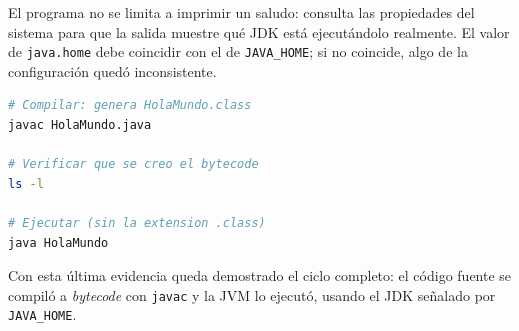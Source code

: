El programa no se limita a imprimir un saludo: consulta las propiedades del sistema para
que la salida muestre qué JDK está ejecutándolo realmente. El valor de
\texttt{java.home} debe coincidir con el de \texttt{JAVA\_HOME}; si no coincide, algo de
la configuración quedó inconsistente.


\begin{lstlisting}[language=bash,caption={Compilación y ejecución},morekeywords={javac,java,ls}]
# Compilar: genera HolaMundo.class
javac HolaMundo.java

# Verificar que se creo el bytecode
ls -l

# Ejecutar (sin la extension .class)
java HolaMundo
\end{lstlisting}


Con esta última evidencia queda demostrado el ciclo completo: el código fuente se
compiló a \textit{bytecode} con \texttt{javac} y la JVM lo ejecutó, usando el JDK
señalado por \texttt{JAVA\_HOME}.
